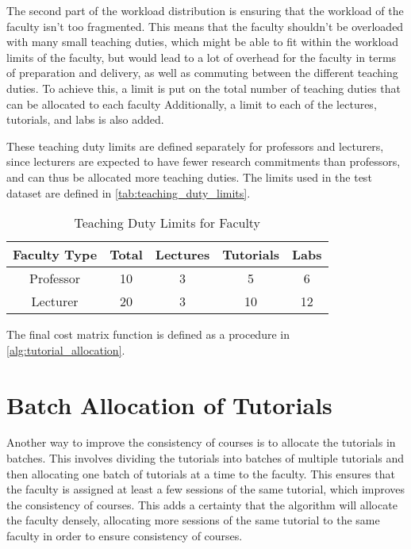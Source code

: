 The second part of the workload distribution is ensuring that the workload of the faculty isn't too fragmented. This means that the faculty shouldn't be overloaded with many small teaching duties, which might be able to fit within the workload limits of the faculty, but would lead to a lot of overhead for the faculty in terms of preparation and delivery, as well as commuting between the different teaching duties. To achieve this, a limit is put on the total number of teaching duties that can be allocated to each faculty Additionally, a limit to each of the lectures, tutorials, and labs is also added.

These teaching duty limits are defined separately for professors and lecturers, since lecturers are expected to have fewer research commitments than professors, and can thus be allocated more teaching duties. The limits used in the test dataset are defined in \autoref{tab:teaching_duty_limits}.

\begin{table}[H]
  \centering
  \begin{tabular}{|c|c|c|c|c|}
    \hline
    Faculty Type & Total & Lectures & Tutorials & Labs \\ \hline
    Professor    & 10    & 3        & 5         & 6    \\ \hline
    Lecturer     & 20    & 3        & 10        & 12   \\ \hline
  \end{tabular}
  \caption{Teaching Duty Limits for Faculty}
  \label{tab:teaching_duty_limits}
\end{table}

The final cost matrix function is defined as a procedure in \autoref{alg:tutorial_allocation}.

\section{Batch Allocation of Tutorials}

Another way to improve the consistency of courses is to allocate the tutorials in batches. This involves dividing the tutorials into batches of multiple tutorials and then allocating one batch of tutorials at a time to the faculty. This ensures that the faculty is assigned at least a few sessions of the same tutorial, which improves the consistency of courses. This adds a certainty that the algorithm will allocate the faculty densely, allocating more sessions of the same tutorial to the same faculty in order to ensure consistency of courses.

